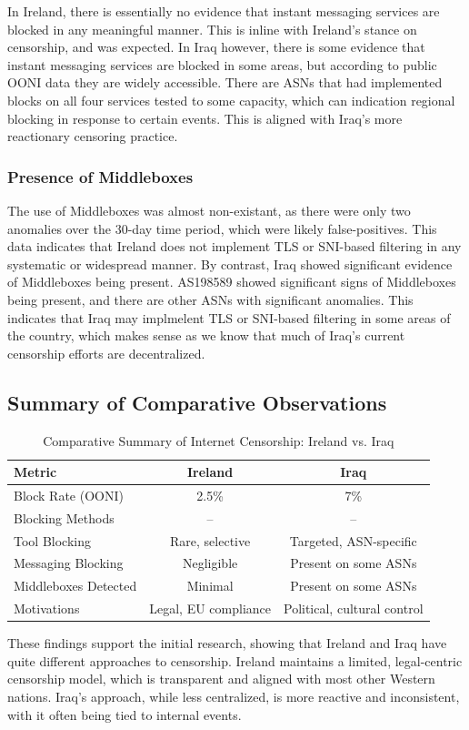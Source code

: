 In Ireland, there is essentially no evidence that instant messaging services are blocked in any meaningful manner. This is inline with Ireland's stance on censorship, and was expected. In Iraq however, there is some evidence that instant messaging services are blocked in some areas, but according to public OONI data they are widely accessible. There are ASNs that had implemented blocks on all four services tested to some capacity, which can indication regional blocking in response to certain events. This is aligned with Iraq's more reactionary censoring practice.

\subsubsection{Presence of Middleboxes}

The use of Middleboxes was almost non-existant, as there were only two anomalies over the 30-day time period, which were likely false-positives. This data indicates that Ireland does not implement TLS or SNI-based filtering in any systematic or widespread manner. By contrast, Iraq showed significant evidence of Middleboxes being present. AS198589 showed significant signs of Middleboxes being present, and there are other ASNs with significant anomalies. This indicates that Iraq may implmelent TLS or SNI-based filtering in some areas of the country, which makes sense as we know that much of Iraq's current censorship efforts are decentralized. 

\subsection{Summary of Comparative Observations}

\begin{table}[H]
\centering
\caption{Comparative Summary of Internet Censorship: Ireland vs. Iraq}
\begin{tabular}{lcc}
\toprule
\textbf{Metric} & \textbf{Ireland} & \textbf{Iraq} \\
\midrule
Block Rate (OONI) & 2.5\% & 7\% \\
Blocking Methods & -- & -- \\
Tool Blocking & Rare, selective & Targeted, ASN-specific \\
Messaging Blocking & Negligible & Present on some ASNs \\
Middleboxes Detected & Minimal & Present on some ASNs \\
Motivations & Legal, EU compliance & Political, cultural control \\
\bottomrule
\end{tabular}
\label{tab:comparison_summary}
\end{table}

These findings support the initial research, showing that Ireland and Iraq have quite different approaches to censorship. Ireland maintains a limited, legal-centric censorship model, which is transparent and aligned with most other Western nations. Iraq's approach, while less centralized, is more reactive and inconsistent, with it often being tied to internal events. 

